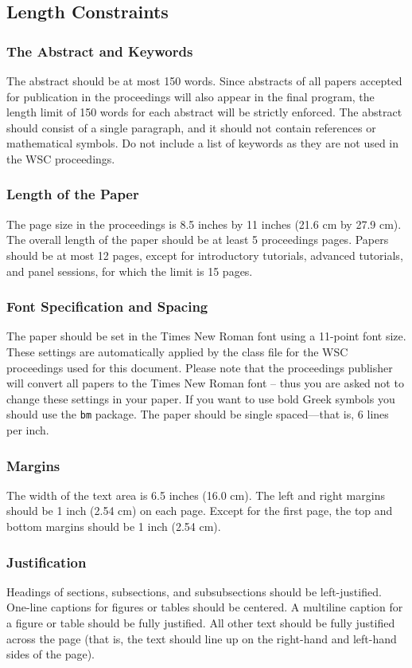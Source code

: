 \documentclass{wscpaperproc}
\theoremstyle{wsc}
\begin{document}
\subsection{Length Constraints}

\subsubsection{The Abstract and Keywords}
The abstract should be at most 150 words. Since abstracts of all papers accepted for publication in the proceedings will also appear in the final program, the length limit of 150 words for each abstract will be strictly enforced. The abstract should consist of a single paragraph, and it should not
contain references or mathematical symbols. Do not include a list of keywords as they are not used in the WSC proceedings.

\subsubsection{Length of the Paper}
The page size in the proceedings is 8.5 inches by 11 inches (21.6 cm by 27.9 cm). The overall length of the paper should be at least 5 proceedings pages. Papers should be at most 12 pages, except for introductory tutorials, advanced tutorials, and panel sessions, for which the limit is 15 pages.

\subsubsection{Font Specification and Spacing}
The paper should be set in the Times New Roman font using a 11-point font size.
These settings are automatically applied by the class file for the WSC proceedings used for this document.
Please note that the proceedings publisher will convert all papers to the Times New Roman font -- thus you are asked not to change these settings in your paper.
If you want to use bold Greek symbols you should use the {\tt bm} package.
The paper should be single spaced---that is, 6 lines per inch.

\subsubsection{Margins}
The width of the text area is 6.5 inches (16.0 cm). The left and right margins should be 1 inch (2.54 cm) on each page. Except for the first page, the top and bottom margins should be 1 inch (2.54 cm).

\subsubsection{Justification}
Headings of sections, subsections, and subsubsections should be left-justified. One-line captions for figures or tables should be centered.
A multiline caption for a figure or table should be fully justified. All other text should be fully justified across the page (that is, the text should line up on the right-hand and left-hand sides of the page).
\end{document}
